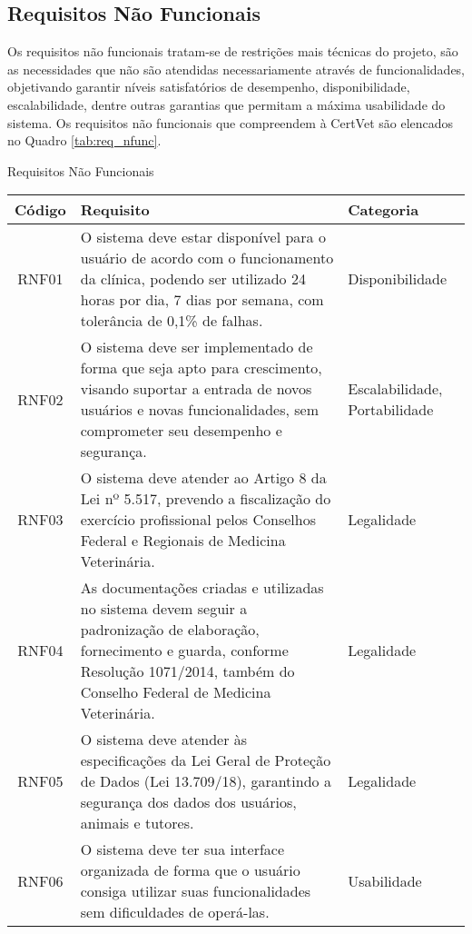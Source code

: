 \documentclass[
    12pt,               %
    openright,          %
    oneside,
    a4paper,            %
    BIBLATEX,           %
    TODO,               %
    english,            %
    brazil              %
    ]{ifsp-spo-inf-ctds}
\begin{document}
        \subsection{Requisitos Não Funcionais}

            Os requisitos não funcionais tratam-se de restrições mais técnicas do projeto, são as necessidades que não são atendidas necessariamente através de funcionalidades, objetivando garantir níveis satisfatórios  de desempenho, disponibilidade, escalabilidade, dentre outras garantias que permitam a máxima usabilidade do sistema. Os requisitos não funcionais que compreendem à CertVet são elencados no Quadro \ref{tab:req_nfunc}.

            \begin{center}
                \begin{quadro}[h]
                  \caption{Requisitos Não Funcionais}
                \begin{tabulary}{1.0\textwidth}{|C|p{25em}|p{7em}|}
                \hline
                Código & Requisito & Categoria\\
                \hline
                RNF01 & O sistema deve estar disponível para o usuário de acordo com o funcionamento da clínica, podendo ser utilizado 24 horas por dia, 7 dias por semana, com tolerância de 0,1\% de falhas. & Disponibilidade\\
                \hline
                RNF02 & O sistema deve ser implementado de forma que seja apto para crescimento, visando suportar a entrada de novos usuários e novas funcionalidades, sem comprometer seu desempenho e segurança. & Escalabilidade, Portabilidade\\
                \hline
                RNF03 & O sistema deve atender ao Artigo 8 da Lei nº 5.517, prevendo a fiscalização do exercício profissional pelos Conselhos Federal e Regionais de Medicina Veterinária. & Legalidade\\
                \hline
                RNF04 & As documentações criadas e utilizadas no sistema devem seguir a padronização de elaboração, fornecimento e guarda, conforme Resolução 1071/2014, também do Conselho Federal de Medicina Veterinária. & Legalidade\\
                \hline
                RNF05 & O sistema deve atender às especificações da Lei Geral de Proteção de Dados (Lei 13.709/18), garantindo a segurança dos dados dos usuários, animais e tutores. & Legalidade\\
                \hline
                RNF06 & O sistema deve ter sua interface organizada de forma que o usuário consiga utilizar suas funcionalidades sem dificuldades de operá-las. & Usabilidade\\

\end{tabulary}
\end{quadro}
\end{center}
\end{document}
